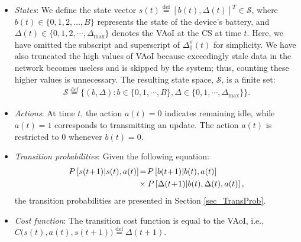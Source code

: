 \documentclass[lettersize,journal]{IEEEtran}
\begin{document}
    \begin{itemize}[leftmargin=0.15in]
		\item \textit{States}: We define the state vector $s(t)\overset{\text{def}}{=}\left[b(t),\Delta(t)\right]^T \in \mathcal{S}$, where $b(t) \in \{0,1,2,\ldots,B\}$ represents the state of the device's battery, and $\Delta(t) \in \{0,1,2,\cdots,\Delta_{\text{max}}\}$ denotes the VAoI at the CS at time $t$. Here, we have omitted the subscript and superscript of $\Delta_0^\pi(t)$ for simplicity. We have also truncated the high values of VAoI because exceedingly stale data in the network becomes useless and is skipped by the system; thus, counting these higher values is unnecessary. The resulting state space, $\mathcal{S}$, is a finite set:
        \begin{align*}
            \mathcal{S} \overset{\text{def}}{=} \big\{(b,\Delta)\!: b \in \{0,1,\cdots,B\} , \Delta \in \{0,1,\cdots,\Delta_{\text{max}}\} \big\}.
        \end{align*}
        
		\item \textit{Actions}: At time $t$, the action $a(t)=0$ indicates remaining idle, while $a(t)=1$ corresponds to transmitting an update. The action $a(t)$ is restricted to $0$ whenever $b(t)=0$.
        
		\item \textit{Transition probabilities}: Given the following equation: 
		\begin{align}
			\label{TransProb_Eqn}
			P\left[s(t\!+\!1)| s(t),a(t)\right]\!&=\!P\left[b(t\!+\!1)|b(t),a(t)\right]  \\
			&\times  P\left[\Delta(t\!+\!1)|b(t),\Delta(t),a(t)\right], \notag
		\end{align}
		the transition probabilities are presented in Section \ref{sec_TransProb}.
        
		\item \textit{Cost function}: The transition cost function is equal to the VAoI, i.e., $C\big( s(t), a(t),s(t+1)\big)\overset{\text{def}}{=}\Delta(t+1)$.
	\end{itemize}
\end{document}
